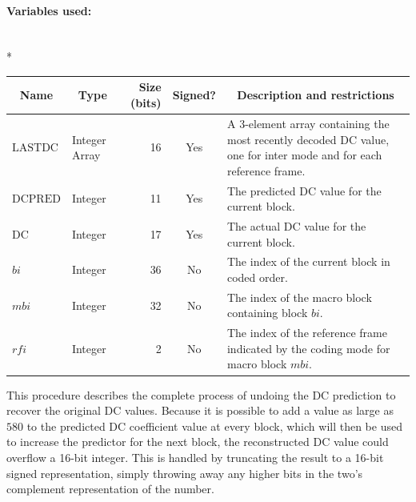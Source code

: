 \documentclass[9pt,letterpaper]{book}
\newcommand{\idx}[1]{{\ensuremath{\mathit{#1}}}}
\newcommand{\bi}{\idx{bi}}
\newcommand{\mbi}{\idx{mbi}}
\newcommand{\rfi}{\idx{rfi}}
\newcommand{\locvar}[1]{\ensuremath{\mathrm{#1}}}
\numberwithin{equation}{chapter}
\numberwithin{figure}{chapter}
\numberwithin{table}{chapter}
\begin{document}
\paragraph{Variables used:}\hfill\\*
\begin{tabularx}{\textwidth}{@{}llrcX@{}}\toprule
\multicolumn{1}{c}{Name} &
\multicolumn{1}{c}{Type} &
\multicolumn{1}{p{30pt}}{\centering Size (bits)} &
\multicolumn{1}{c}{Signed?} &
\multicolumn{1}{c}{Description and restrictions} \\\midrule\endhead
\locvar{LASTDC}   & \multicolumn{1}{p{40pt}}{Integer Array} &
                              16 & Yes & A 3-element array containing the
 most recently decoded DC value, one for inter mode and for each reference
 frame. \\
\locvar{DCPRED}   & Integer & 11 & Yes & The predicted DC value for the current
 block. \\
\locvar{DC}       & Integer & 17 & Yes & The actual DC value for the current
 block. \\
\locvar{\bi}      & Integer & 36 & No  & The index of the current block in
 coded order. \\
\locvar{\mbi}     & Integer & 32 & No  & The index of the macro block
 containing block \locvar{\bi}. \\
\locvar{\rfi}     & Integer &  2 & No  & The index of the reference frame
 indicated by the coding mode for macro block \locvar{\mbi}. \\
\bottomrule\end{tabularx}
\medskip

This procedure describes the complete process of undoing the DC prediction to
 recover the original DC values.
Because it is possible to add a value as large as $580$ to the predicted DC
 coefficient value at every block, which will then be used to increase the
 predictor for the next block, the reconstructed DC value could overflow a
 16-bit integer.
This is handled by truncating the result to a 16-bit signed representation,
 simply throwing away any higher bits in the two's complement representation of
 the number.
\end{document}
